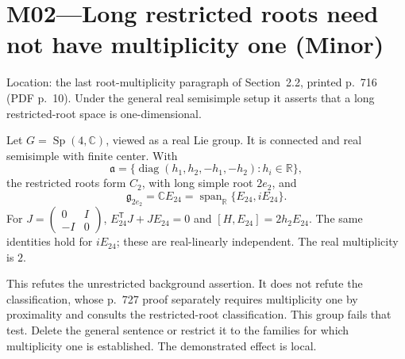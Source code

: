 \documentclass[10pt]{article}
\begin{document}
\section*{M02—Long restricted roots need not have multiplicity one (Minor)}
Location: the last root-multiplicity paragraph of Section 2.2, printed p. 716 (PDF p. 10). Under the general real semisimple setup it asserts that a long restricted-root space is one-dimensional.\par
Let \(G=\operatorname{Sp}(4,\mathbb C)\), viewed as a real Lie group. It is connected and real semisimple with finite center. With \[\mathfrak a=\{\operatorname{diag}(h_1,h_2,-h_1,-h_2):h_i\in\mathbb R\},\] the restricted roots form \(C_2\), with long simple root \(2e_2\), and \[\mathfrak g_{2e_2}=\mathbb CE_{24}=\operatorname{span}_{\mathbb R}\{E_{24},iE_{24}\}.\] For \(J=\left(\begin{smallmatrix}0&I\\-I&0\end{smallmatrix}\right)\), \(E_{24}^{\mathsf T}J+JE_{24}=0\) and \([H,E_{24}]=2h_2E_{24}\). The same identities hold for \(iE_{24}\); these are real-linearly independent. The real multiplicity is \(2\).\par
This refutes the unrestricted background assertion. It does not refute the classification, whose p. 727 proof separately requires multiplicity one by proximality and consults the restricted-root classification. This group fails that test. Delete the general sentence or restrict it to the families for which multiplicity one is established. The demonstrated effect is local.\par
\end{document}
